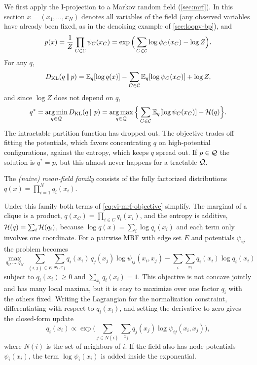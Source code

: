 We first apply the I-projection to a Markov random field (\cref{sec:mrf}). In this section $x=(x_1,\dots,x_N)$ denotes all variables of the field (any observed variables have already been fixed, as in the denoising example of \cref{sec:loopy-bp}), and
\[
p(x)=\frac1Z\prod_{C\in\mathcal{C}}\psi_C(x_C)=\exp\Big(\sum_{C\in\mathcal{C}}\log\psi_C(x_C)-\log Z\Big).
\]
For any $q$,
\[
D_{\mathrm{KL}}(q\,\|\,p)=\mathbb{E}_q[\log q(x)]-\sum_{C\in\mathcal{C}}\mathbb{E}_q[\log\psi_C(x_C)]+\log Z,
\]
and since $\log Z$ does not depend on $q$,
\begin{equation}\label{eq:vi-mrf-objective}
q^*=\operatorname*{arg\,min}_{q\in\mathcal{Q}}D_{\mathrm{KL}}(q\,\|\,p)=\operatorname*{arg\,max}_{q\in\mathcal{Q}}\Big\{\sum_{C\in\mathcal{C}}\mathbb{E}_q[\log\psi_C(x_C)]+\mathcal{H}(q)\Big\}.
\end{equation}
The intractable partition function has dropped out. The objective trades off fitting the potentials, which favors concentrating $q$ on high-potential configurations, against the entropy, which keeps $q$ spread out. If $p\in\mathcal{Q}$ the solution is $q^*=p$, but this almost never happens for a tractable $\mathcal{Q}$.

\begin{definition}\label{def:mean-field}
The \emph{(naive) mean-field family} consists of the fully factorized distributions $q(x)=\prod_{i=1}^Nq_i(x_i)$.
\end{definition}

Under this family both terms of \eqref{eq:vi-mrf-objective} simplify. The marginal of a clique is a product, $q(x_C)=\prod_{i\in C}q_i(x_i)$, and the entropy is additive, $\mathcal{H}(q)=\sum_i\mathcal{H}(q_i)$, because $\log q(x)=\sum_i\log q_i(x_i)$ and each term only involves one coordinate. For a pairwise MRF with edge set $E$ and potentials $\psi_{ij}$ the problem becomes
\begin{equation}\label{eq:vi-pairwise}
\max_{q_1,\dots,q_N}\ \sum_{(i,j)\in E}\sum_{x_i,x_j}q_i(x_i)\,q_j(x_j)\log\psi_{ij}(x_i,x_j)-\sum_{i}\sum_{x_i}q_i(x_i)\log q_i(x_i)
\end{equation}
subject to $q_i(x_i)\ge0$ and $\sum_{x_i}q_i(x_i)=1$. This objective is not concave jointly and has many local maxima, but it is easy to maximize over one factor $q_i$ with the others fixed. Writing the Lagrangian for the normalization constraint, differentiating with respect to $q_i(x_i)$, and setting the derivative to zero gives the closed-form update
\begin{equation}\label{eq:mf-update}
q_i(x_i)\propto\exp\Big(\sum_{j\in N(i)}\sum_{x_j}q_j(x_j)\log\psi_{ij}(x_i,x_j)\Big),
\end{equation}
where $N(i)$ is the set of neighbors of $i$. If the field also has node potentials $\psi_i(x_i)$, the term $\log\psi_i(x_i)$ is added inside the exponential.

